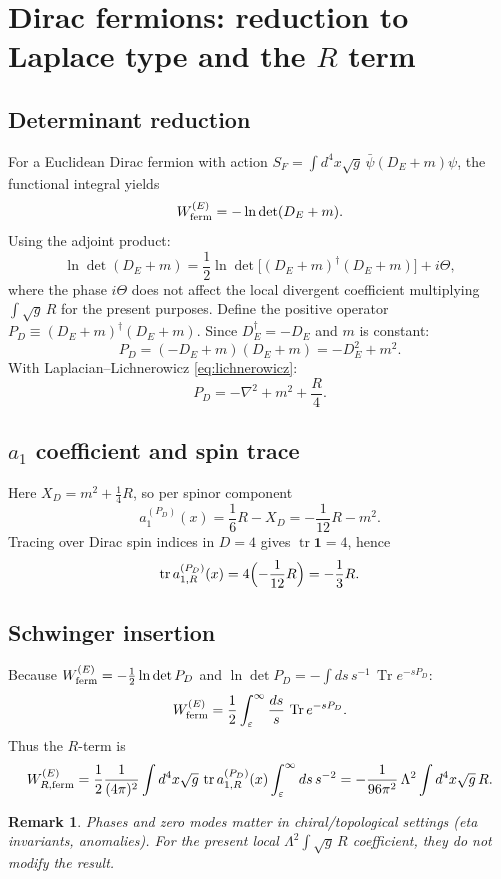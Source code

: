 \documentclass[11pt]{article}
\newtheorem{remark}{Remark}
\newcommand{\tr}{\operatorname{tr}}
\newcommand{\Tr}{\operatorname{Tr}}
\begin{document}
\section{Dirac fermions: reduction to Laplace type and the $R$ term}

\subsection{Determinant reduction}
For a Euclidean Dirac fermion with action
$S_F = \int d^4x \sqrt{g}\, \bar\psi (D_E + m) \psi$,
the functional integral yields
\[
W^{(E)}_{\rm ferm} = -\ln\det(D_E + m).
\]
Using the adjoint product:
\[
\ln\det(D_E + m) = \frac{1}{2}\ln\det\bigl[(D_E+m)^\dagger (D_E+m)\bigr]
+ i\Theta,
\]
where the phase $i\Theta$ does not affect the local divergent coefficient
multiplying $\int\sqrt{g}\,R$ for the present purposes. Define the positive
operator $P_D \equiv (D_E+m)^\dagger (D_E+m)$. Since $D_E^\dagger = -D_E$ and
$m$ is constant:
\[
P_D = (-D_E + m)(D_E + m) = -D_E^2 + m^2.
\]
With Laplacian--Lichnerowicz \eqref{eq:lichnerowicz}:
\begin{equation}
P_D = -\nabla^2 + m^2 + \frac{R}{4}.
\label{eq:PD}
\end{equation}

\subsection{$a_1$ coefficient and spin trace}
Here $X_D = m^2 + \tfrac14 R$, so per spinor component
\[
a_1^{(P_D)}(x) = \frac{1}{6}R - X_D = -\frac{1}{12}R - m^2.
\]
Tracing over Dirac spin indices in $D=4$ gives $\tr\mathbf{1} = 4$, hence
\begin{equation}
\tr a_{1,R}^{(P_D)}(x) = 4\Bigl(-\frac{1}{12}R\Bigr) = -\frac{1}{3}R.
\label{eq:a1dirac}
\end{equation}

\subsection{Schwinger insertion}
Because $W^{(E)}_{\rm ferm} = -\tfrac12 \ln\det P_D$ and
$\ln\det P_D = -\int ds\, s^{-1}\, \Tr e^{-sP_D}$:
\[
W^{(E)}_{\rm ferm} = \frac{1}{2}\int_\varepsilon^\infty \frac{ds}{s}\,
\Tr e^{-sP_D}.
\]
Thus the $R$-term is
\begin{equation}
W^{(E)}_{R,\rm ferm} = \frac{1}{2}\frac{1}{(4\pi)^2}
\int d^4x \sqrt{g}\, \tr a_{1,R}^{(P_D)}(x) \int_\varepsilon^\infty ds\,s^{-2}
= -\frac{1}{96\pi^2}\,\Lambda^2 \int d^4x \sqrt{g}\, R.
\label{eq:Wferm}
\end{equation}
\begin{remark}
Phases and zero modes matter in chiral/topological settings (eta invariants,
anomalies). For the present local $\Lambda^2 \int\sqrt{g}\,R$ coefficient,
they do not modify the result.
\end{remark}
\end{document}
